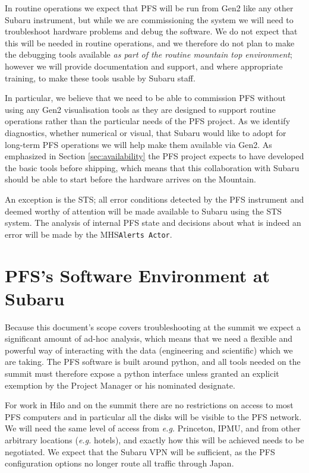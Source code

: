 \documentclass[12pt]{article}
\newcommand{\eg}{\textit{e.g.}\xspace}
\newcommand{\MHS}{\gls{MHS}\xspace}
\newcommand{\PFS}{\gls{PFS}\xspace}
\newcommand{\secRef}[1]{Section \ref{sec:#1}}
\begin{document}
In routine operations we expect that \PFS will be run from \gls{Gen2} like any other Subaru instrument,
but while we are commissioning the system we will need to troubleshoot hardware problems and debug
the software.  We do not expect that this will be needed in routine operations, and we therefore do
not plan to make the debugging tools available \textit{as part of the routine mountain top environment};
however we will provide documentation and support, and where appropriate training, to make these tools
usable by Subaru staff.

In particular, we believe that we need to be able to commission \PFS without using any \gls{Gen2} visualisation
tools as they are designed to support routine operations rather than the particular needs of the \PFS project.
As we identify diagnostics, whether numerical or visual, that Subaru would like to adopt for long-term
\PFS operations we will help make them available via \gls{Gen2}.  As emphasized in \secRef{availability}
the \PFS project expects to have developed the basic tools before shipping, which means that this
collaboration with Subaru should be able to start before the hardware arrives on the Mountain.

An exception is the \gls{STS}; all error conditions detected by the \PFS instrument and deemed worthy
of attention will be made available to Subaru using the \gls{STS} system.  The analysis of
internal \PFS state and decisions about what is indeed an error will be made by the \MHS \texttt{Alerts Actor}.

\section{PFS's Software Environment at Subaru}

Because this document's scope covers troubleshooting at the summit we expect a significant amount of ad-hoc
analysis, which means that we need a flexible and powerful way of interacting with the data (engineering and
scientific) which we are taking.  The \PFS software is built around python, and all tools needed on the summit
must therefore expose a python interface unless granted an explicit exemption by the Project Manager or
his nominated designate.

For work in Hilo and on the summit there are no restrictions on access to most \PFS computers and in
particular all the disks will be visible to the \PFS network.  We will need the same level of access from \eg
Princeton, IPMU, and from other arbitrary locations (\eg hotels), and exactly how this will be achieved needs
to be negotiated.  We expect that the Subaru \gls{VPN} will be sufficient, as the \PFS
configuration options no longer route all traffic through Japan.
\end{document}
